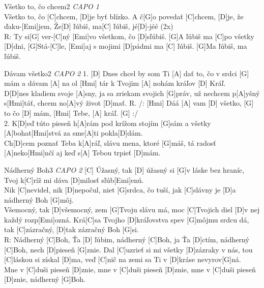 \documentclass[12pt]{article}
\begin{document}
\begin{song}{Všetko to, čo chcem}{2}
	\textit{CAPO 1}\\
	[G]Všetko to, čo [C]chcem, 
	[D]je byť blízko.
	A č[G]o povedať [C]chcem, 
	[D]je, že ďaku-[Emi]jem,
	Že[D] ľúbiš, ma[C] ľúbiš, jé[D]-jéé (2x)
	\\
	R: Ty si[G] ver-[C]ný 
	[Emi]vo všetkom, čo [D]sľúbiš.
	[G]A ľúbiš ma [C]po všetky [D]dni,
	[G]Stá-[C]le, [Emi]aj s mojimi [D]pádmi ma [C] ľúbiš.
	[G]Ma ľúbiš, ma ľúbiš.
\end{song}

\begin{song}{Dávam všetko}{2}
	\textit{CAPO 2}
	1. [D] Dnes chcel by som Ti [A] dať
	to, čo v srdci [G] mám
	a dávam [A] na ol [Hmi] tár
	k Tvojim [A] nohám kráľov [D] Kráľ.
	\\
	D[D]nes kladiem svoje [A]sny,
	ja sa zriekam svojich [G]práv,
	už nechcem p[A]yšný s[Hmi]táť,
	chcem no[A]vý život [D]mať.
	\columnbreak
	R. /: [Hmi] Dáá [A] vam [D] všetko,
	[G] to čo [D] mám, [Hmi] Tebe, [A] kráľ. [G] :/
	\\
	2. K[D]eď túto pieseň h[A]rám
	pod krížom stojím [G]sám
	a všetky [A]bohat[Hmi]stvá
	za sme[A]ti pokla[D]dám.
	\\
	Ch[D]cem poznať Teba k[A]ráľ,
	slávu mena, ktoré [G]máš,
	tá radosť [A]neko[Hmi]nčí
	aj keď s[A] Tebou trpieť [D]mám.
\end{song}

\begin{song}{Nádherný Boh}{3}
	\textit{CAPO 2}
	[C] Úžasný, tak [D] úžasný
	si [G]v láske bez hraníc,
	Tvoj k[C]ríž mi dáva
	[D]milosť sľúb[Emi]enú.
	\\
	Nik [C]nevidel, nik [D]nepočul,
	niet [G]srdca, čo tuší,
	jak [C]slávny je 
	[D]a nádherný Boh [G]môj.
	\\
	[C]Všemocný, tak [D]všemocný,
	zem [G]Tvoju slávu má,
	moc [C]Tvojich diel
	[D]v nej každý rozp[Emi]ozná.
	\columnbreak
	Krá[C]sa Tvojho [D]kráľovstva
	spev [G]môjmu srdcu dá,
	tak [C]zázračný,
	[D]tak zázračný Boh [G]si.
	\\
	R:
	Nádherný [C]Boh, Ťa [D] ľúbim,
	nádherný [C]Boh, ja Ťa [D]ctím,
	nádherný [C]Boh, nech [D]pieseň 
	[G]znie.
	\columnbreak
	Dal [C]uzrieť si mi
	všetky [D]zázraky v nás,
	tou [C]láskou si získal [D]ma,
	veď [C]nič na zemi
	sa Ti v [D]kráse nevyrov[G]ná.
	\\
	Mne v [C]duši pieseň [D]znie,
	mne v [C]duši pieseň [D]znie,
	mne v [C]duši pieseň [D]znie,
	nádherný [G]Boh.
\end{song}
\end{document}
